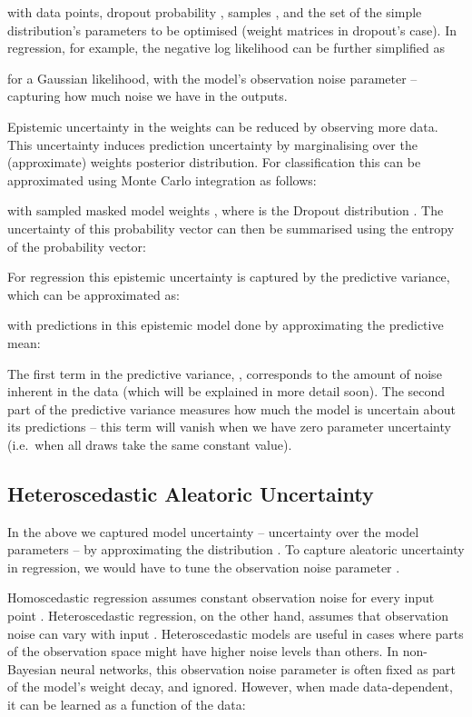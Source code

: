 \documentclass{article}
\begin{document}
with  data points, dropout probability , samples , and  the set of the simple distribution's parameters to be optimised (weight matrices in dropout's case). In regression, for example, the negative log likelihood can be further simplified as

for a Gaussian likelihood,
with  the model's observation noise parameter -- capturing how much noise we have in the outputs.

Epistemic uncertainty in the weights can be reduced by observing more data. This uncertainty induces prediction uncertainty by marginalising over the (approximate) weights posterior distribution. For classification this can be approximated using Monte Carlo integration as follows:

with  sampled masked model weights , where  is the Dropout distribution \citep{gal2016thesis}. 
The uncertainty of this probability vector  can then be summarised using the entropy of the probability vector:

For regression this epistemic uncertainty is captured by the predictive variance, which can be approximated as:

with predictions in this epistemic model done by approximating the predictive mean: 

The first term in the predictive variance, , corresponds to the amount of noise inherent in the data (which will be explained in more detail soon). The second part of the predictive variance measures how much the model is uncertain about its predictions -- this term will vanish when we have zero parameter uncertainty (i.e.\ when all draws  take the same constant value). 

\subsection{Heteroscedastic Aleatoric Uncertainty}
\label{sect:hetero}

In the above we captured model uncertainty -- uncertainty over the model parameters -- by approximating the distribution . To capture aleatoric uncertainty in regression, we would have to tune the observation noise parameter .

Homoscedastic regression assumes constant observation noise  for every input point . Heteroscedastic regression, on the other hand, assumes that observation noise can vary with input  \citep{nix1994estimating, le2005heteroscedastic}. Heteroscedastic models are useful in cases where parts of the observation space might have higher noise levels than others.
In non-Bayesian neural networks, this observation noise parameter is often fixed as part of the model's weight decay, and ignored. However, when made data-dependent, it can be learned as a function of the data:
\end{document}
